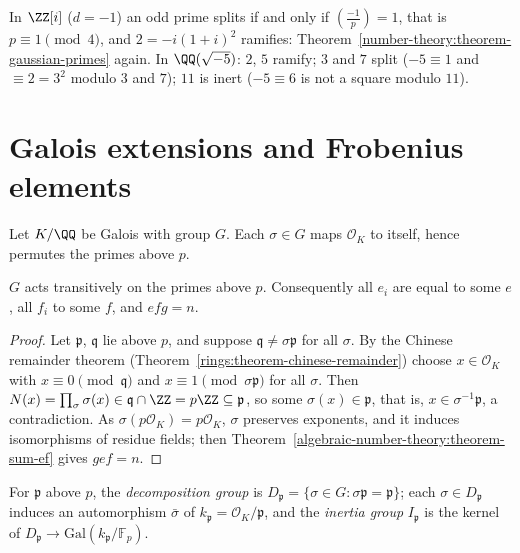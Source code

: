 \begin{example}\label{algebraic-number-theory:example-quadratic-splitting}
In $\ZZ[i]$ ($d = -1$) an odd prime splits if and only if $(\frac{-1}{p}) = 1$, that is $p \equiv 1 \pmod 4$, and $2 = -i(1 + i)^2$ ramifies: Theorem~\ref{number-theory:theorem-gaussian-primes} again. In
$\QQ(\sqrt{-5})$: $2$, $5$ ramify; $3$ and $7$ split ($-5 \equiv 1$ and $\equiv 2 = 3^2$ modulo $3$ and $7$); $11$ is inert ($-5 \equiv 6$ is not a square modulo $11$).
\end{example}

\section{Galois extensions and Frobenius elements}\label{algebraic-number-theory:section-galois}

Let $K/\QQ$ be Galois with group $G$. Each $\sigma \in G$ maps $\mathcal{O}_K$ to itself, hence permutes the primes above $p$.

\begin{proposition}\label{algebraic-number-theory:proposition-transitive}
$G$ acts transitively on the primes above $p$. Consequently all $e_i$ are equal to some $e$, all $f_i$ to some $f$, and $efg = n$.
\end{proposition}

\begin{proof}
Let $\mathfrak{p}$, $\mathfrak{q}$ lie above $p$, and suppose $\mathfrak{q} \neq \sigma\mathfrak{p}$ for all $\sigma$. By the Chinese remainder theorem (Theorem~\ref{rings:theorem-chinese-remainder}) choose
$x \in \mathcal{O}_K$ with $x \equiv 0 \pmod{\mathfrak{q}}$ and $x \equiv 1 \pmod{\sigma\mathfrak{p}}$ for all $\sigma$. Then $N(x) = \prod_\sigma\sigma(x) \in \mathfrak{q} \cap \ZZ = p\ZZ \subseteq \mathfrak{p}$, so some
$\sigma(x) \in \mathfrak{p}$, that is, $x \in \sigma^{-1}\mathfrak{p}$, a contradiction. As $\sigma(p\mathcal{O}_K) = p\mathcal{O}_K$, $\sigma$ preserves exponents, and it induces isomorphisms of residue fields; then
Theorem~\ref{algebraic-number-theory:theorem-sum-ef} gives $gef = n$.
\end{proof}

\begin{definition}\label{algebraic-number-theory:definition-decomposition-group}
For $\mathfrak{p}$ above $p$, the \emph{decomposition group} is $D_\mathfrak{p} = \{\sigma \in G : \sigma\mathfrak{p} = \mathfrak{p}\}$; each $\sigma \in D_\mathfrak{p}$ induces an automorphism $\bar\sigma$ of
$k_\mathfrak{p} = \mathcal{O}_K/\mathfrak{p}$, and the \emph{inertia group} $I_\mathfrak{p}$ is the kernel of $D_\mathfrak{p} \to \mathrm{Gal}(k_\mathfrak{p}/\mathbb{F}_p)$.
\end{definition}

